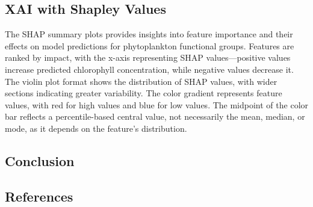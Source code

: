 \documentclass[
]{agujournal2019}
\begin{document}
\subsection{XAI with Shapley Values}\label{xai-with-shapley-values}

The SHAP summary plots provides insights into feature importance and
their effects on model predictions for phytoplankton functional groups.
Features are ranked by impact, with the x-axis representing SHAP
values---positive values increase predicted chlorophyll concentration,
while negative values decrease it. The violin plot format shows the
distribution of SHAP values, with wider sections indicating greater
variability. The color gradient represents feature values, with red for
high values and blue for low values. The midpoint of the color bar
reflects a percentile-based central value, not necessarily the mean,
median, or mode, as it depends on the feature's distribution.

\subsection{Conclusion}\label{conclusion}

\subsection*{References}\label{references}
\end{document}
